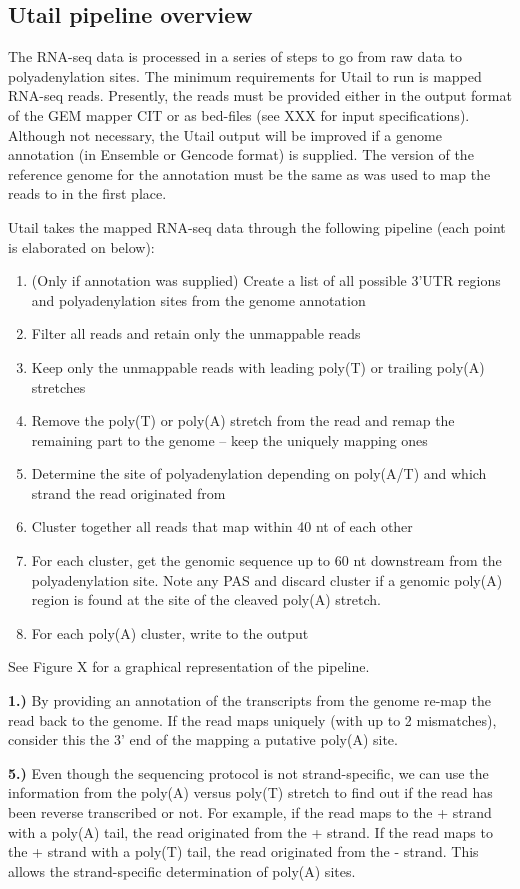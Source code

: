 \subsection{Utail pipeline overview}
The RNA-seq data is processed in a series of steps to go from raw data to
polyadenylation sites. The minimum requirements for Utail to run is mapped
RNA-seq reads. Presently, the reads must be provided either in the output
format of the GEM mapper CIT or as bed-files (see XXX for input
specifications). Although not necessary, the Utail output will be improved if a
genome annotation (in Ensemble or Gencode format) is supplied. The version of
the reference genome for the annotation must be the same as was used to map the
reads to in the first place.

Utail takes the mapped RNA-seq data through the following pipeline (each point
is elaborated on below):
\begin{enumerate}
	\item (Only if annotation was supplied) Create a list of all possible
		3'UTR regions and polyadenylation sites from the genome annotation
	\item Filter all reads and retain only the unmappable reads
	\item Keep only the unmappable reads with leading poly(T) or trailing
		poly(A) stretches
	\item Remove the poly(T) or poly(A) stretch from the read and remap the
		remaining part to the genome -- keep the uniquely mapping ones
	\item Determine the site of polyadenylation depending on poly(A/T) and which
		strand the read originated from
	\item Cluster together all reads that map within 40 nt of each other
	\item For each cluster, get the genomic sequence up to 60 nt downstream
		from the polyadenylation site. Note any PAS and discard cluster if a
		genomic poly(A) region is found at the site of the cleaved poly(A)
		stretch.
	\item For each poly(A) cluster, write to the output
\end{enumerate}
See Figure X for a graphical representation of the pipeline.

\textbf{1.)} By providing an annotation of the transcripts from the genome
re-map the read back to the genome. If the read maps uniquely (with up to 2
mismatches), consider this the 3' end of the mapping a putative poly(A) site.

\textbf{5.)} Even though the sequencing protocol is not strand-specific, we can
use the information from the poly(A) versus poly(T) stretch to find out if the
read has been reverse transcribed or not. For example, if the read maps to the
+ strand with a poly(A) tail, the read originated from the + strand. If the
read maps to the + strand with a poly(T) tail, the read originated from the -
strand. This allows the strand-specific determination of poly(A) sites.

